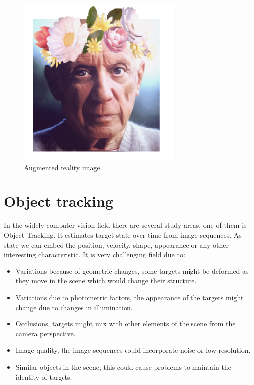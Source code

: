 \begin{figure}[H]
\centering         
\includegraphics[width=8cm]{aplicaciones/picassioHuai.png}
\caption{Augmented reality image.} \label{introrgbd}
\end{figure}





\section{Object tracking}

In the widely computer vision field there are several study areas, one of them is Object Tracking. It estimates target state over time from image sequences. As state we can embed the position, velocity, shape, appearance or any other interesting characteristic. It is very challenging field due to:


\begin{itemize}

\item Variations because of geometric changes, some targets might be deformed as they move in the scene which would change their structure.

\item Variations due to photometric factors, the appearance of the targets might change due to changes in illumination.

\item Occlusions, targets might mix with other elements of the scene from the camera perspective.

\item Image quality, the image sequences could incorporate noise or low resolution.

\item Similar objects in the scene, this could cause problems to maintain the identity of targets.

\end{itemize}

